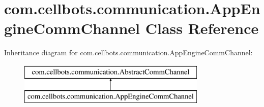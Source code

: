 \hypertarget{classcom_1_1cellbots_1_1communication_1_1_app_engine_comm_channel}{\section{com.\-cellbots.\-communication.\-App\-Engine\-Comm\-Channel Class Reference}
\label{classcom_1_1cellbots_1_1communication_1_1_app_engine_comm_channel}
}
Inheritance diagram for com.\-cellbots.\-communication.\-App\-Engine\-Comm\-Channel\-:\begin{figure}[H]
\begin{center}
\leavevmode
\includegraphics[height=2.000000cm]{classcom_1_1cellbots_1_1communication_1_1_app_engine_comm_channel}
\end{center}
\end{figure}
